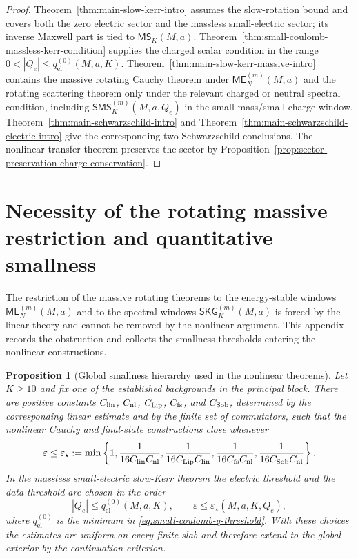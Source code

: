 \documentclass[11pt]{article}
\numberwithin{equation}{section}
\theoremstyle{plain}
\newtheorem{proposition}[theorem]{Proposition}
\theoremstyle{definition}
\theoremstyle{remark}
\newcommand{\SKG}{\mathsf{SKG}}
\newcommand{\ME}{\mathsf{ME}}
\newcommand{\MScat}{\mathsf{MS}}
\newcommand{\SMS}{\mathsf{SMS}}
\begin{document}
\begin{proof}
Theorem~\ref{thm:main-slow-kerr-intro} assumes the slow-rotation bound and covers both the zero electric sector and the massless small-electric sector; its inverse Maxwell part is tied to \(\MScat_K(M,a)\).  Theorem~\ref{thm:small-coulomb-massless-kerr-condition} supplies the charged scalar condition in the range \(0<|Q_e|\le q^{(0)}_{\mathrm{el}}(M,a,K)\).  Theorem~\ref{thm:main-slow-kerr-massive-intro} contains the massive rotating Cauchy theorem under \(\ME^{(m)}_N(M,a)\) and the rotating scattering theorem only under the relevant charged or neutral spectral condition, including \(\SMS_K^{(m)}(M,a,Q_e)\) in the small-mass/small-charge window.  Theorem~\ref{thm:main-schwarzschild-intro} and Theorem~\ref{thm:main-schwarzschild-electric-intro} give the corresponding two Schwarzschild conclusions.  The nonlinear transfer theorem preserves the sector by Proposition~\ref{prop:sector-preservation-charge-conservation}.
\end{proof}

\section{Necessity of the rotating massive restriction and quantitative smallness}\label{app:sharpness}

The restriction of the massive rotating theorems to the energy-stable windows \(\ME^{(m)}_N(M,a)\) and to the spectral windows \(\SKG^{(m)}_K(M,a)\) is forced by the linear theory and cannot be removed by the nonlinear argument. This appendix records the obstruction and collects the smallness thresholds entering the nonlinear constructions.
\begin{proposition}[Global smallness hierarchy used in the nonlinear theorems]\label{prop:global-smallness-hierarchy}
Let \(K\ge10\) and fix one of the established backgrounds in the principal block.  There are positive constants \(C_{\rm lin}\), \(C_{\rm nl}\), \(C_{\rm Lip}\), \(C_{\rm fs}\), and \(C_{\rm Sob}\), determined by the corresponding linear estimate and by the finite set of commutators, such that the nonlinear Cauchy and final-state constructions close whenever
\begin{equation}\label{eq:global-epsilon-choice}
 \varepsilon\le \varepsilon_\star:=\min\left\{1,
 \frac{1}{16C_{\rm lin}C_{\rm nl}},
 \frac{1}{16C_{\rm Lip}C_{\rm lin}},
 \frac{1}{16C_{\rm fs}C_{\rm nl}},
 \frac{1}{16C_{\rm Sob}C_{\rm nl}}
 \right\}.
\end{equation}
In the massless small-electric slow-Kerr theorem the electric threshold and the data threshold are chosen in the order
\begin{equation}\label{eq:q-then-eps-choice}
 |Q_e|\le q^{(0)}_{\mathrm{el}}(M,a,K),
 \qquad
 \varepsilon\le \varepsilon_\star(M,a,K,Q_e),
\end{equation}
where \(q^{(0)}_{\mathrm{el}}\) is the minimum in \eqref{eq:small-coulomb-q-threshold}.  With these choices the estimates are uniform on every finite slab and therefore extend to the global exterior by the continuation criterion.
\end{proposition}
\end{document}
